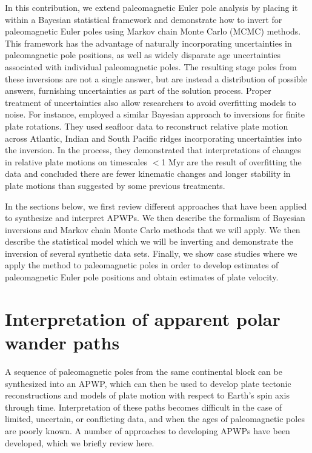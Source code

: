 \documentclass[11pt,letterpaper]{article}
\begin{document}
In this contribution, we extend paleomagnetic Euler pole analysis by placing it within a Bayesian statistical framework and demonstrate how to invert for paleomagnetic Euler poles using Markov chain Monte Carlo (MCMC) methods. This framework has the advantage of naturally incorporating uncertainties in paleomagnetic pole positions, as well as widely disparate age uncertainties associated with individual paleomagnetic poles. The resulting stage poles from these inversions are not a single answer, but are instead a distribution of possible answers, furnishing uncertainties as part of the solution process. Proper treatment of uncertainties also allow researchers to avoid overfitting models to noise. For instance, \cite{Iaffaldano2012a} employed a similar Bayesian approach to inversions for finite plate rotations. They used seafloor data to reconstruct relative plate motion across Atlantic, Indian and South Pacific ridges incorporating uncertainties into the inversion. In the process, they demonstrated that interpretations of changes in relative plate motions on timescales $<$1 Myr are the result of overfitting the data and concluded there are fewer kinematic changes and longer stability in plate motions than suggested by some previous treatments.

In the sections below, we first review different approaches that have been applied to synthesize and interpret APWPs. We then describe the formalism of Bayesian inversions and Markov chain Monte Carlo methods that we will apply. We then describe the statistical model which we will be inverting and demonstrate the inversion of several synthetic data sets. Finally, we show case studies where we apply the method to paleomagnetic poles in order to develop estimates of paleomagnetic Euler pole positions and obtain estimates of plate velocity.

\section*{Interpretation of apparent polar wander paths}

A sequence of paleomagnetic poles from the same continental block can be synthesized into an APWP, which can then be used to develop plate tectonic reconstructions and models of plate motion with respect to Earth's spin axis through time. Interpretation of these paths becomes difficult in the case of limited, uncertain, or conflicting data, and when the ages of paleomagnetic poles are poorly known. A number of approaches to developing APWPs have been developed, which we briefly review here.
\end{document}
